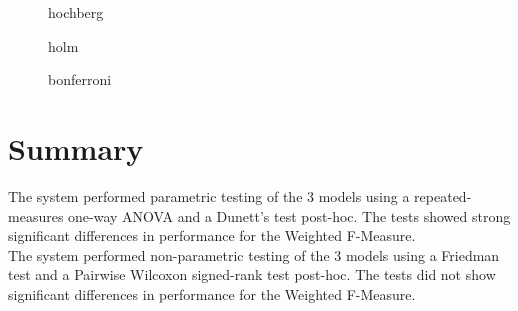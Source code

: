\documentclass[a4paper,12pt]{article}
\begin{document}
\begin{table}[h!]
\centering
\begin{subfigure}[b]{4cm}
\centering
{}\caption{hochberg}
\end{subfigure}
\begin{subfigure}[b]{4cm}
\centering
{}\caption{holm}
\end{subfigure}
\begin{subfigure}[b]{4cm}
\centering
{}\caption{bonferroni}
\end{subfigure}
\caption{Adjusted p-values from the Pairwise Wilcoxon signed-rank test for Weighted F-Measure}
\label{tbl:PairwiseWilcoxonsigned-ranktestWeightedF-MeasureAdjusted}
\end{table}

\FloatBarrier
\section{Summary}
The system performed parametric testing of the 3 models using a repeated-measures one-way ANOVA and a Dunett's test post-hoc. The tests showed strong significant differences in performance for the Weighted F-Measure. \\ 

The system performed non-parametric testing of the 3 models using a Friedman test and a Pairwise Wilcoxon signed-rank test post-hoc. The tests did not show significant differences in performance for the Weighted F-Measure. \\ 
\end{document}

